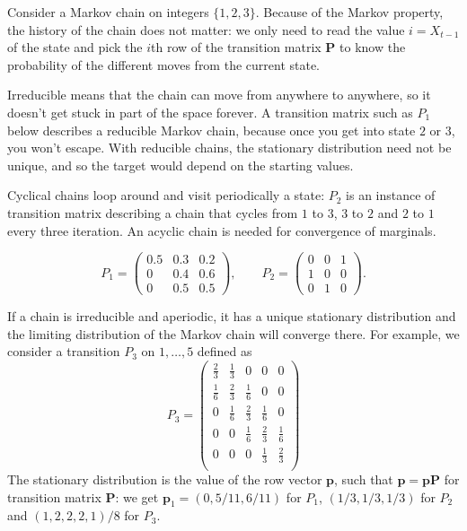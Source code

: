 \documentclass[
  11pt,
  letterpaper,
]{scrbook}
\theoremstyle{definition}
\theoremstyle{plain}
\theoremstyle{plain}
\theoremstyle{definition}
\theoremstyle{definition}
\theoremstyle{remark}
\begin{document}
Consider a Markov chain on integers \(\{1, 2, 3\}\). Because of the
Markov property, the history of the chain does not matter: we only need
to read the value \(i=X_{t-1}\) of the state and pick the \(i\)th row of
the transition matrix \(\mathbf{P}\) to know the probability of the
different moves from the current state.

Irreducible means that the chain can move from anywhere to anywhere, so
it doesn't get stuck in part of the space forever. A transition matrix
such as \(P_1\) below describes a reducible Markov chain, because once
you get into state \(2\) or \(3\), you won't escape. With reducible
chains, the stationary distribution need not be unique, and so the
target would depend on the starting values.

Cyclical chains loop around and visit periodically a state: \(P_2\) is
an instance of transition matrix describing a chain that cycles from
\(1\) to \(3\), \(3\) to \(2\) and \(2\) to \(1\) every three iteration.
An acyclic chain is needed for convergence of marginals.

\[
P_1 = \begin{pmatrix}
0.5 & 0.3 & 0.2 \\
0 & 0.4 & 0.6 \\
0 & 0.5 & 0.5
\end{pmatrix},
\qquad
P_2 = \begin{pmatrix}
0 & 0 & 1 \\
1 & 0 & 0 \\
0 & 1 & 0
\end{pmatrix}.
\]

If a chain is irreducible and aperiodic, it has a unique stationary
distribution and the limiting distribution of the Markov chain will
converge there. For example, we consider a transition \(P_3\) on
\(1, \ldots, 5\) defined as \[
P_3 = \begin{pmatrix}
\frac{2}{3} & \frac{1}{3} &  0 & 0 & 0 \\
\frac{1}{6} & \frac{2}{3} & \frac{1}{6} & 0 & 0 \\
0 & \frac{1}{6} & \frac{2}{3} & \frac{1}{6} & 0 \\
0 & 0 & \frac{1}{6} & \frac{2}{3} & \frac{1}{6} \\
0 & 0 & 0 &  \frac{1}{3}  & \frac{2}{3} \\
\end{pmatrix}
\] The stationary distribution is the value of the row vector
\(\boldsymbol{p}\), such that
\(\boldsymbol{p} = \boldsymbol{p}\mathbf{P}\) for transition matrix
\(\mathbf{P}\): we get \(\boldsymbol{p}_1=(0, 5/11, 6/11)\) for \(P_1\),
\((1/3, 1/3, 1/3)\) for \(P_2\) and \((1,2,2,2,1)/8\) for \(P_3\).
\end{document}

